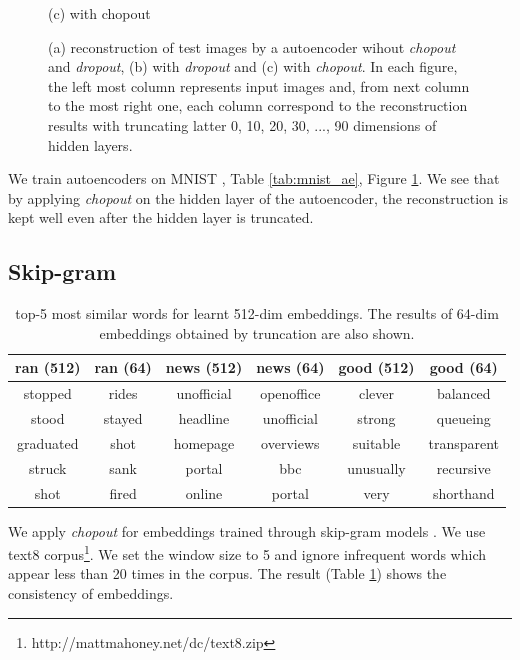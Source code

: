\documentclass{article}
\begin{document}
\begin{figure}
\begin{minipage}{0.33\linewidth}
\begin{center}
        \hspace{1.6cm} (c) with chopout
      \end{center}
    \end{minipage}    
    \caption{(a) reconstruction of test images by a autoencoder wihout \textit{chopout} and \textit{dropout}, (b) with \textit{dropout} and (c) with \textit{chopout}. 
    In each figure, the left most column represents input images and, from next column to the most right one, each column correspond to the reconstruction results with truncating latter 0, 10, 20, 30, ..., 90 dimensions of hidden layers.}
    \label{fig:mnist_ae}
    \end{figure}
    
    We train autoencoders on MNIST \cite{lecun1998gradient}, Table \ref{tab:mnist_ae}, Figure \ref{fig:mnist_ae}. We see that by applying \textit{chopout} on the hidden layer of the autoencoder, the reconstruction is kept well even after the hidden layer is truncated.
    
    \subsection{Skip-gram}
    
    \begin{table}[h]
        \caption{top-5 most similar words for learnt 512-dim embeddings. The results of 64-dim embeddings obtained by truncation are also shown.}    
        \centering
        \begin{tabular}{c|c|c|c|c|c}
            ran (512) & ran (64) & news (512) & news (64) & good (512) & good (64) \\ \hline \hline
            stopped & rides & unofficial & openoffice & clever & balanced \\
            stood & stayed & headline & unofficial & strong & queueing \\
            graduated & shot & homepage & overviews & suitable & transparent \\
            struck & sank & portal & bbc & unusually & recursive \\
            shot & fired & online & portal & very & shorthand \\
        \end{tabular}
        \label{tab:skip_gram}
    \end{table}    
    
    We apply \textit{chopout} for embeddings trained through skip-gram models \cite{mikolov2013efficient, mikolov2013distributed}. We use text8 corpus\footnote{http://mattmahoney.net/dc/text8.zip}. We set the window size to 5 and ignore infrequent words which appear less than 20 times in the corpus. The result (Table \ref{tab:skip_gram}) shows the consistency of embeddings.
\end{document}
